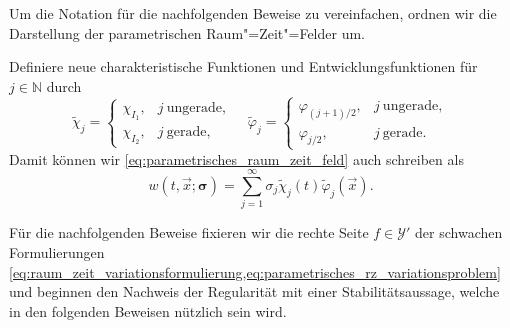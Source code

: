 \documentclass[../main.tex]{subfiles}
\begin{document}
Um die Notation für die nachfolgenden Beweise zu vereinfachen, ordnen wir die Darstellung der parametrischen Raum"=Zeit"=Felder um.
\begin{Bemerkung}
    Definiere neue charakteristische Funktionen und Entwicklungsfunktionen für $j \in \mathbb{N}$ durch
    \begin{equation}
        \tilde{\chi}_{j} = \begin{cases}
            \chi_{I_{1}}, & j~\text{ungerade},\\
            \chi_{I_{2}}, & j~\text{gerade},
        \end{cases} \quad
        \tilde{\varphi}_{j} = \begin{cases}
            \varphi_{(j+1)/{2}}, & j~\text{ungerade},\\
            \varphi_{j / 2}, & j~\text{gerade}.
        \end{cases}
    \end{equation}
    Damit können wir \cref{eq:parametrisches_raum_zeit_feld} auch schreiben als
    \begin{equation}
        w(t, \vec{x}; \bm \sigma) = \sum_{j = 1}^{\infty} \sigma_{j} \tilde{\chi}_{j}(t) \tilde{\varphi}_{j}(\vec{x}).
    \end{equation}
\end{Bemerkung}

Für die nachfolgenden Beweise fixieren wir die rechte Seite $f \in \mathcal Y'$ der schwachen Formulierungen \cref{eq:raum_zeit_variationsformulierung,eq:parametrisches_rz_variationsproblem} und beginnen den Nachweis der Regularität mit einer Stabilitätsaussage, welche in den folgenden Beweisen nützlich sein wird.
\end{document}
